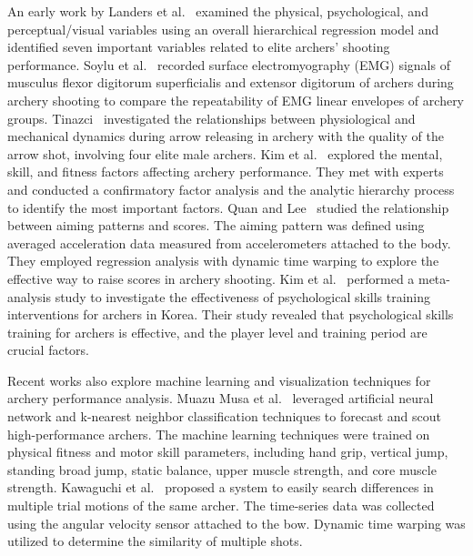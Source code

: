 \documentclass[runningheads]{llncs}
\begin{document}
An early work by Landers et al.\ \cite{Landers-RQES86} examined the physical, psychological, and perceptual/visual variables using an overall hierarchical regression model and identified seven important variables related to elite archers' shooting performance. 
%
Soylu et al.\ \cite{Soylu-HMS06} recorded surface electromyography (EMG) signals of musculus flexor digitorum superficialis and extensor digitorum of archers during archery shooting to compare the repeatability of EMG linear envelopes of archery groups. 
%
Tinazci~\cite{Tinazci-PE11} investigated the relationships between physiological and mechanical dynamics during arrow releasing in archery with the quality of the arrow shot, involving four elite male archers.
%
Kim et al.\ \cite{Kim-TJSCR15} explored the mental, skill, and fitness factors affecting archery performance. They met with experts and conducted a confirmatory factor analysis and the analytic hierarchy process to identify the most important factors. 
%
Quan and Lee~\cite{Quan-KJSB16} studied the relationship between aiming patterns and scores. The aiming pattern was defined using averaged acceleration data measured from accelerometers attached to the body. They employed regression analysis with dynamic time warping to explore the effective way to raise scores in archery shooting. 
%
Kim et al.\ \cite{Kim-IJERPH21} performed a meta-analysis study to investigate the effectiveness of psychological skills training interventions for archers in Korea. Their study revealed that psychological skills training for archers is effective, and the player level and training period are crucial factors. 

Recent works also explore machine learning and visualization techniques for archery performance analysis.
%
Muazu Musa et al.\ \cite{Muazu-Musa-SS19} leveraged artificial neural network and k-nearest neighbor classification techniques to forecast and scout high-performance archers. The machine learning techniques were trained on physical fitness and motor skill parameters, including hand grip, vertical jump, standing broad jump, static balance, upper muscle strength, and core muscle strength.
%
Kawaguchi et al.\ \cite{Kawaguchi-AH20} proposed a system to easily search differences in multiple trial motions of the same archer. The time-series data was collected using the angular velocity sensor attached to the bow. Dynamic time warping was utilized to determine the similarity of multiple shots. 
\end{document}

